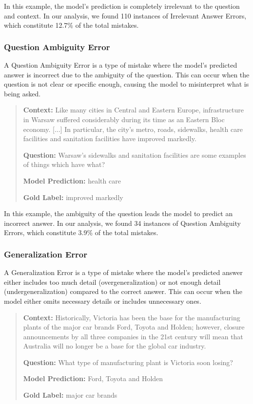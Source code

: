 \documentclass{article}
\begin{document}
In this example, the model's prediction is completely irrelevant to the
question and context. In our analysis, we found 110 instances of
Irrelevant Answer Errors, which constitute 12.7\% of the total mistakes.

\subsubsection*{Question Ambiguity Error}

A Question Ambiguity Error is a type of mistake where the model's predicted
answer is incorrect due to the ambiguity of the question. This can occur when
the question is not clear or specific enough, causing the model to misinterpret
what is being asked.

\begin{quote}
\textbf{Context:} Like many cities in Central and Eastern Europe,
infrastructure in Warsaw suffered considerably during its time as an Eastern
Bloc economy. [...] In particular, the city's metro, roads, sidewalks, health
care facilities and sanitation facilities have improved markedly.

\textbf{Question:} Warsaw's sidewalks and sanitation facilities are some
examples of things which have what?

\textbf{Model Prediction:} health care

\textbf{Gold Label:} improved markedly
\end{quote}

In this example, the ambiguity of the question leads the model to predict an
incorrect answer. In our analysis, we found 34 instances of
Question Ambiguity Errors, which constitute 3.9\% of the total mistakes.

\subsubsection*{Generalization Error}

A Generalization Error is a type of mistake where the model's predicted answer
either includes too much detail (overgeneralization) or not enough detail
(undergeneralization) compared to the correct answer. This can occur when the
model either omits necessary details or includes unnecessary ones.

\begin{quote}
\textbf{Context:} Historically, Victoria has been the base for the
manufacturing plants of the major car brands Ford, Toyota and Holden; however,
closure announcements by all three companies in the 21st century will mean that
Australia will no longer be a base for the global car industry.

\textbf{Question:} What type of manufacturing plant is Victoria soon losing?

\textbf{Model Prediction:} Ford, Toyota and Holden

\textbf{Gold Label:} major car brands
\end{quote}
\end{document}
